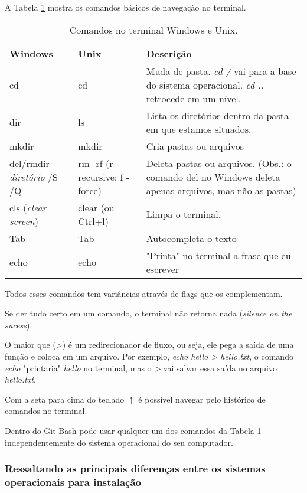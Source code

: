 \documentclass[12pt,a4paper]{article}
\begin{document}
	A Tabela \ref{tab:Comandos} mostra os comandos básicos de navegação no terminal.

	\begin{table}[!htpb]
		\centering
		\begin{tabular}{|p{}|p{}|p{}|}%
			\hline
			Windows & Unix & Descrição\\
			\hline
			cd & cd & Muda de pasta. \textit{cd /} vai para a base do sistema operacional. \textit{cd ..} retrocede em um nível. \\
			\hline
			dir & ls & Lista os diretórios dentro da pasta em que estamos situados. \\
			\hline
			mkdir & mkdir & Cria pastas ou arquivos \\
			\hline
			del/rmdir \textit{diretório} /S /Q & rm -rf (r- recursive; f - force) & Deleta pastas ou arquivos. (Obs.: o comando del no Windows deleta apenas arquivos, mas não as pastas)\\
			\hline
			cls (\textit{clear screen}) & clear (ou Ctrl+l) & Limpa o terminal. \\
			\hline
			Tab & Tab & Autocompleta o texto \\
			\hline
			echo & echo & "Printa" no terminal a frase que eu escrever\\
			\hline
		\end{tabular}
		\caption{Comandos no terminal Windows e Unix.}
		\label{tab:Comandos}
	\end{table}
	
	Todos esses comandos tem variâncias através de flags que os complementam.
	
	Se der tudo certo em um comando, o terminal não retorna nada (\textit{silence on the sucess}).
	
	O maior que (>) é um redirecionador de fluxo, ou seja, ele pega a saída de uma função e coloca em um arquivo. Por exemplo, \textit{echo hello > hello.txt}, o comando \textit{echo} "printaria" \textit{hello} no terminal, mas o \textit{>} vai salvar essa saída no arquivo \textit{hello.txt}.
	
	Com a seta para cima do teclado $\uparrow$ é possível navegar pelo histórico de comandos no terminal.
	
	Dentro do Git Bash pode usar qualquer um dos comandos da Tabela \ref{tab:Comandos} independentemente do sistema operacional do seu computador.
	
	\subsubsection{Ressaltando as principais diferenças entre os sistemas operacionais para instalação}
	
\end{document}
